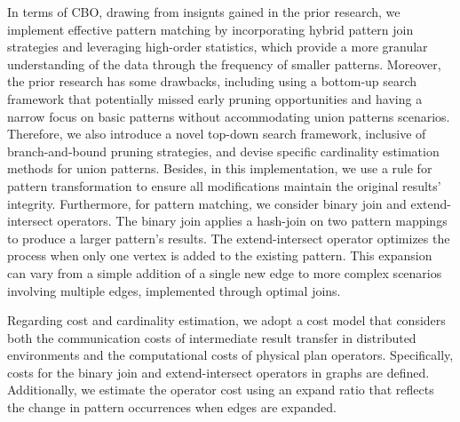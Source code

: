 In terms of CBO, drawing from insignts gained in the prior research, we implement effective pattern matching by incorporating hybrid pattern join strategies and leveraging high-order statistics, which provide a more granular understanding of the data through the frequency of smaller patterns.
Moreover, the prior research has some drawbacks, including using a bottom-up search framework that potentially missed early pruning opportunities and having a narrow focus on basic patterns without accommodating union patterns scenarios.
Therefore, we also introduce a novel top-down search framework, inclusive of branch-and-bound pruning strategies, and devise specific cardinality estimation methods for union patterns. 
Besides, in this implementation, we use a rule for pattern transformation to ensure all modifications maintain the original results’ integrity.
Furthermore, for pattern matching, we consider binary join and extend-intersect operators. 
The binary join applies a hash-join on two pattern mappings to produce a larger pattern's results.
The extend-intersect operator optimizes the process when only one vertex is added to the existing pattern. 
This expansion can vary from a simple addition of a single new edge to more complex scenarios involving multiple edges, implemented through optimal joins.

Regarding cost and cardinality estimation, we adopt a cost model that considers both the communication costs of intermediate result transfer in distributed environments and the computational costs of physical plan operators. 
Specifically, costs for the binary join and extend-intersect operators in graphs are defined. 
Additionally, we estimate the operator cost using an expand ratio that reflects the change in pattern occurrences when edges are expanded.
